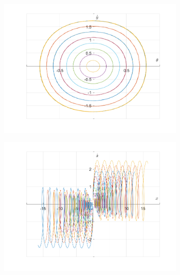 \documentclass{article}
\begin{document}
	\begin{figure}[h!]
		\centering
		\begin{subfigure}[b]{0.48\linewidth}
			\includegraphics[width=\linewidth]{./SmallOscillations/S12/F5.png}
		\end{subfigure}
		\begin{subfigure}[b]{0.48\linewidth}
			\includegraphics[width=\linewidth]{./SmallOscillations/S12/F6.png}
		\end{subfigure}
	\end{figure}
	\newpage
	
\end{document}
